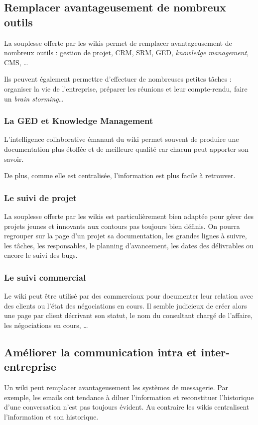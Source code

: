 \documentclass{article}
\begin{document}
\subsection{Remplacer avantageusement de nombreux outils}
La souplesse offerte par les wikis permet de remplacer avantageusement de nombreux outils : gestion de projet, CRM, SRM, GED, \emph{knowledge management}, CMS, \dots

Ils peuvent également permettre d'effectuer de nombreuses petites tâches : organiser la vie de l'entreprise, préparer les réunions et leur compte-rendu, faire un \emph{brain storming}\dots

\subsubsection{La GED et Knowledge Management}
L'intelligence collaborative émanant du wiki permet souvent de produire une documentation plus étoffée et de meilleure qualité car chacun peut apporter son savoir.

De plus, comme elle est centralisée, l'information est plus facile à retrouver.

\subsubsection{Le suivi de projet}
La souplesse offerte par les wikis est particulièrement bien adaptée pour gérer des projets jeunes et innovants aux contours pas toujours bien définis. On pourra regrouper sur la page d'un projet sa documentation, les grandes lignes à suivre, les tâches, les responsables, le planning d'avancement, les dates des délivrables ou encore le suivi des bugs.

\subsubsection{Le suivi commercial}
Le wiki peut être utilisé par des commerciaux pour documenter leur relation avec des clients ou l'état des négociations en cours. Il semble judicieux de créer alors une page par client décrivant son statut, le nom du consultant chargé de l'affaire, les négociations en cours, \dots

\subsection{Améliorer la communication intra et inter-entreprise}
Un wiki peut remplacer avantageusement les systèmes de messagerie. Par exemple, les emails ont tendance à diluer l'information et reconstituer l'historique d'une conversation n'est pas toujours évident. Au contraire les wikis centralisent l'information et son historique.
\end{document}
